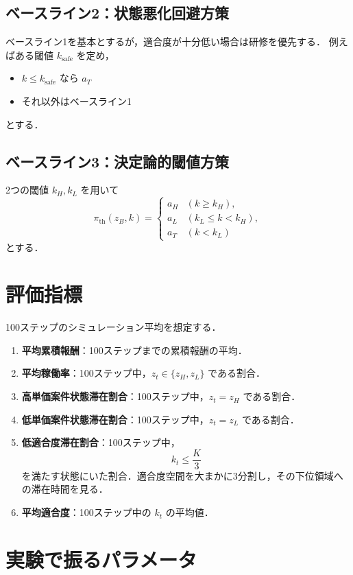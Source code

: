 \documentclass[11pt,a4paper]{bxjsarticle}
\begin{document}
\subsection{ベースライン2：状態悪化回避方策}
ベースライン1を基本とするが，適合度が十分低い場合は研修を優先する．
例えばある閾値 \(k_{\mathrm{safe}}\) を定め，
\begin{itemize}[leftmargin=2em]
    \item \(k \le k_{\mathrm{safe}}\) なら \(a_T\)
    \item それ以外はベースライン1
\end{itemize}
とする．

\subsection{ベースライン3：決定論的閾値方策}
2つの閾値 \(k_H,k_L\) を用いて
\[
    \pi_{\mathrm{th}}(z_B,k)=
    \begin{cases}
        a_H & (k \ge k_H),\\
        a_L & (k_L \le k < k_H),\\
        a_T & (k < k_L)
    \end{cases}
\]
とする．

\section{評価指標}

100ステップのシミュレーション平均を想定する．

\begin{enumerate}[leftmargin=2em,label=(\arabic*)]
    \item \textbf{平均累積報酬}：100ステップまでの累積報酬の平均．
    \item \textbf{平均稼働率}：100ステップ中，\(z_t\in\{z_H,z_L\}\) である割合．
    \item \textbf{高単価案件状態滞在割合}：100ステップ中，\(z_t=z_H\) である割合．
    \item \textbf{低単価案件状態滞在割合}：100ステップ中，\(z_t=z_L\) である割合．
    \item \textbf{低適合度滞在割合}：100ステップ中，
    \[
        k_t \le \frac{K}{3}
    \]
    を満たす状態にいた割合．適合度空間を大まかに3分割し，その下位領域への滞在時間を見る．
    \item \textbf{平均適合度}：100ステップ中の \(k_t\) の平均値．
\end{enumerate}

\section{実験で振るパラメータ}
\end{document}
